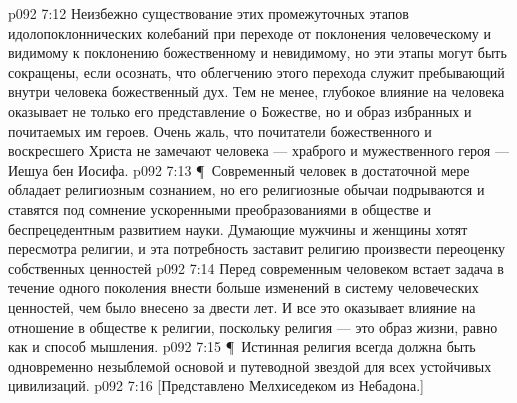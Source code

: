\vs p092 7:12 Неизбежно существование этих промежуточных этапов идолопоклоннических колебаний при переходе от поклонения человеческому и видимому к поклонению божественному и невидимому, но эти этапы могут быть сокращены, если осознать, что облегчению этого перехода служит пребывающий внутри человека божественный дух. Тем не менее, глубокое влияние на человека оказывает не только его представление о Божестве, но и образ избранных и почитаемых им героев. Очень жаль, что почитатели божественного и воскресшего Христа не замечают человека --- храброго и мужественного героя --- Иешуа бен Иосифа.
\vs p092 7:13 \P\ Современный человек в достаточной мере обладает религиозным сознанием, но его религиозные обычаи подрываются и ставятся под сомнение ускоренными преобразованиями в обществе и беспрецедентным развитием науки. Думающие мужчины и женщины хотят пересмотра религии, и эта потребность заставит религию произвести переоценку собственных ценностей
\vs p092 7:14 Перед современным человеком встает задача в течение одного поколения внести больше изменений в систему человеческих ценностей, чем было внесено за двести лет. И все это оказывает влияние на отношение в обществе к религии, поскольку религия --- это образ жизни, равно как и способ мышления.
\vs p092 7:15 \P\ Истинная религия всегда должна быть одновременно незыблемой основой и путеводной звездой для всех устойчивых цивилизаций.
\vs p092 7:16 [Представлено Мелхиседеком из Небадона.]
